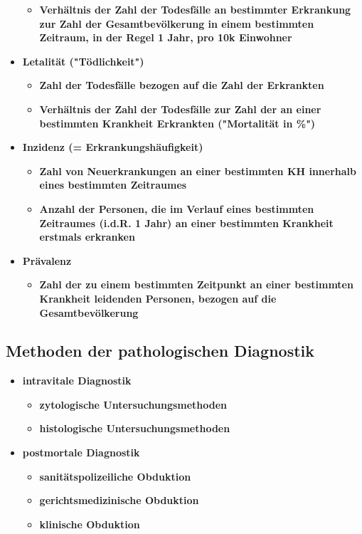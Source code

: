 \begin{itemize}
\begin{itemize}
				\item \textbf{Verhältnis der Zahl der Todesfälle an bestimmter Erkrankung zur Zahl der Gesamtbevölkerung in einem bestimmten Zeitraum, in der Regel 1 Jahr, pro 10k Einwohner}
			\end{itemize}
	\pagebreak
		\item \textbf{Letalität ("Tödlichkeit")}
			\begin{itemize}
				\item \textbf{Zahl der Todesfälle bezogen auf die Zahl der Erkrankten}
				\item \textbf{Verhältnis der Zahl der Todesfälle zur Zahl der an einer bestimmten Krankheit Erkrankten ("Mortalität in \%")}
			\end{itemize}
		\item \textbf{Inzidenz (= Erkrankungshäufigkeit)}
			\begin{itemize}
				\item \textbf{Zahl von Neuerkrankungen an einer bestimmten KH innerhalb eines bestimmten Zeitraumes}
				\item \textbf{Anzahl der Personen, die im Verlauf eines bestimmten Zeitraumes (i.d.R. 1 Jahr) an einer bestimmten Krankheit erstmals erkranken}
			\end{itemize}
		\item \textbf{Prävalenz}
			\begin{itemize}
				\item \textbf{Zahl der zu einem bestimmten Zeitpunkt an einer bestimmten Krankheit leidenden Personen, bezogen auf die Gesamtbevölkerung}
			\end{itemize}
	\end{itemize}

\subsection{Methoden der pathologischen Diagnostik}
	\begin{itemize}
		\item \textbf{intravitale Diagnostik}
			\begin{itemize}
				\item \textbf{zytologische Untersuchungsmethoden}
				\item \textbf{histologische Untersuchungsmethoden}
			\end{itemize}
		\item \textbf{postmortale Diagnostik}
			\begin{itemize}
				\item \textbf{sanitätspolizeiliche Obduktion}
				\item \textbf{gerichtsmedizinische Obduktion}
				\item \textbf{klinische Obduktion}
			\end{itemize}
	\end{itemize}

